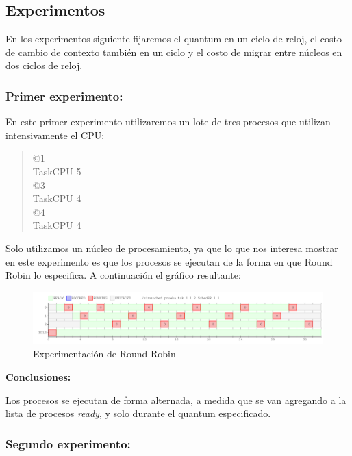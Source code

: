 \subsection{Experimentos}

En los experimentos siguiente fijaremos el quantum en un ciclo de reloj, el costo de cambio de contexto también en un ciclo y el costo de migrar entre núcleos en dos ciclos de reloj.

\subsubsection{Primer experimento:} 

En este primer experimento utilizaremos un lote de tres procesos que utilizan intensivamente el CPU:
\begin{quote}
@1\\
TaskCPU 5\\
@3\\
TaskCPU 4\\
@4\\
TaskCPU 4\\
\end{quote}

Solo utilizamos un núcleo de procesamiento, ya que lo que nos interesa mostrar en este experimento es que los procesos se ejecutan de la forma en que Round Robin lo especifica. A continuación el gráfico resultante:

\begin{figure}[H]
\begin{center}
\includegraphics[width=1.1\textwidth]{img/salida_ej4_1.png}
     \caption{Experimentación de Round Robin}
\end{center}
\end{figure}

\textbf{Conclusiones:}

Los procesos se ejecutan de forma alternada, a medida que se van agregando a la lista de procesos \textit{ready}, y solo durante el quantum especificado.

\subsubsection{Segundo experimento:} 

